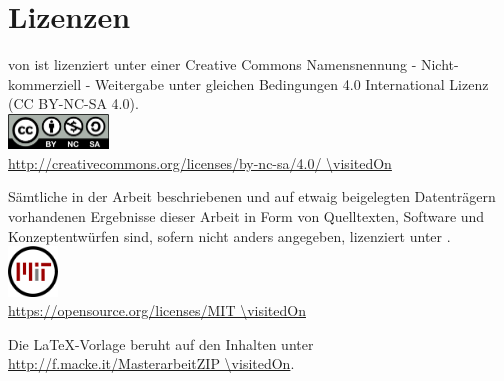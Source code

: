 \chapter*{Lizenzen}

\begin{center}

\vspace*{\fill}

\quotes{\thema} von \autor\space ist lizenziert unter einer Creative Commons Namensnennung - Nicht-kommerziell - Weitergabe unter gleichen Bedingungen 4.0 International Lizenz (CC BY-NC-SA 4.0). \\
\includegraphics[width=0.2\textwidth]{Bilder/by-nc-sa-eu}\\
\url{http://creativecommons.org/licenses/by-nc-sa/4.0/ \visitedOn}

\vspace*{\fill}

Sämtliche in der Arbeit beschriebenen und auf etwaig beigelegten Datenträgern
vorhandenen Ergebnisse dieser Arbeit in Form von Quelltexten, Software und
Konzeptentwürfen sind, sofern nicht anders angegeben, lizenziert unter . \\
\includegraphics[width=0.1\textwidth]{Bilder/mit_license}\\
\url{https://opensource.org/licenses/MIT \visitedOn}

\vspace*{\fill}

Die LaTeX-Vorlage beruht auf den Inhalten unter\\
\url{http://f.macke.it/MasterarbeitZIP \visitedOn}.

\vspace*{\fill}

\end{center}
